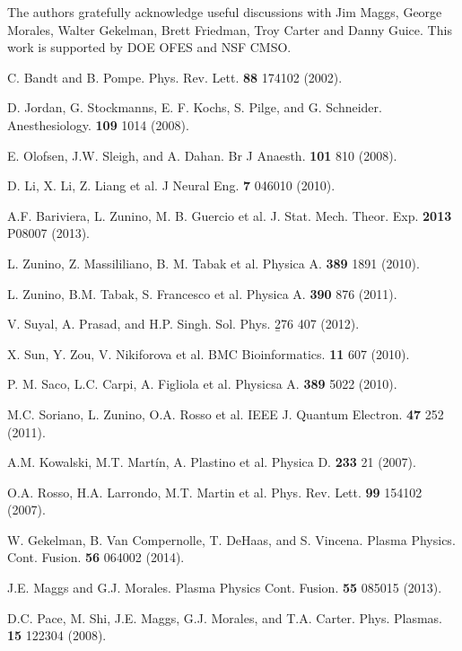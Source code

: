 \documentclass[aps,prx,twocolumn,secnumarabic,nobalancelastpage,amsmath,amssymb,
nofootinbib]{revtex4-1}
\begin{document}
The authors gratefully acknowledge useful discussions with Jim Maggs, George Morales, Walter Gekelman, Brett Friedman, Troy Carter and Danny Guice. This work is supported by DOE OFES and NSF CMSO.

\begin{thebibliography}{99}
C. Bandt and B. Pompe. Phys. Rev. Lett. {\bf 88} 174102 (2002).

D. Jordan, G. Stockmanns, E. F. Kochs, S. Pilge, and G. Schneider. Anesthesiology. {\bf 109} 1014 (2008).

E. Olofsen, J.W. Sleigh, and A. Dahan. Br J Anaesth. {\bf 101} 810 (2008).

D. Li, X. Li, Z. Liang et al. J Neural Eng. {\bf 7} 046010 (2010).

A.F. Bariviera, L. Zunino, M. B. Guercio et al. J. Stat. Mech. Theor. Exp. {\bf 2013} P08007 (2013).

L. Zunino, Z. Massililiano, B. M. Tabak et al. Physica A. {\bf 389} 1891 (2010).

L. Zunino, B.M. Tabak, S. Francesco et al. Physica A. {\bf 390} 876 (2011).

V. Suyal, A. Prasad, and H.P. Singh. Sol. Phys. {\b 276} 407 (2012).

X. Sun, Y. Zou, V. Nikiforova et al. BMC Bioinformatics. {\bf 11} 607 (2010).

P. M. Saco, L.C. Carpi, A. Figliola et al. Physicsa A. {\bf 389} 5022 (2010).

M.C. Soriano, L. Zunino, O.A. Rosso et al. IEEE J. Quantum Electron. {\bf 47} 252 (2011).

A.M. Kowalski, M.T. Mart{\'i}n, A. Plastino et al. Physica D. {\bf 233} 21 (2007).

O.A. Rosso, H.A. Larrondo, M.T. Martin et al. Phys. Rev. Lett. {\bf 99} 154102 (2007).

W. Gekelman, B. Van Compernolle, T. DeHaas, and S. Vincena. Plasma Physics. Cont. Fusion. {\bf 56} 064002 (2014).

J.E. Maggs and G.J. Morales. Plasma Physics Cont. Fusion. {\bf 55} 085015 (2013).

D.C. Pace, M. Shi, J.E. Maggs, G.J. Morales, and T.A. Carter. Phys. Plasmas. {\bf 15} 122304 (2008).


\end{thebibliography}
\end{document}
